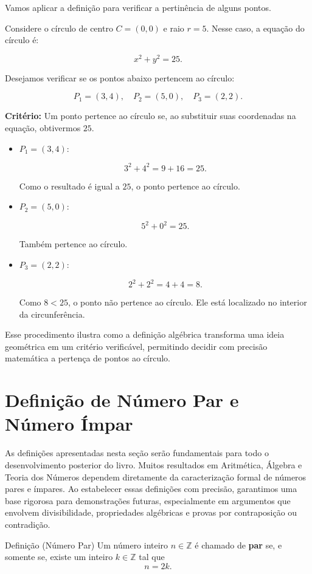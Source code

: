 \documentclass[12pt,a4paper,openright]{book}
\begin{document}
Vamos aplicar a definição para verificar a pertinência de alguns pontos.

Considere o círculo de centro \(C = (0,0)\) e raio \(r = 5\). Nesse caso, a equação do círculo é:

\[
x^2 + y^2 = 25.
\]

Desejamos verificar se os pontos abaixo pertencem ao círculo:

\[
P_1 = (3,4), \quad P_2 = (5,0), \quad P_3 = (2,2).
\]

\textbf{Critério:} Um ponto pertence ao círculo se, ao substituir suas coordenadas na equação, obtivermos \(25\).

\begin{itemize}
\item \(P_1 = (3,4)\):

\[
3^2 + 4^2 = 9 + 16 = 25.
\]

Como o resultado é igual a \(25\), o ponto pertence ao círculo.

\item \(P_2 = (5,0)\):

\[
5^2 + 0^2 = 25.
\]

Também pertence ao círculo.

\item \(P_3 = (2,2)\):

\[
2^2 + 2^2 = 4 + 4 = 8.
\]

Como \(8 < 25\), o ponto não pertence ao círculo. Ele está localizado no interior da circunferência.
\end{itemize}

Esse procedimento ilustra como a definição algébrica transforma uma ideia geométrica em um critério verificável, permitindo decidir com precisão matemática a pertença de pontos ao círculo.\section{Definição de Número Par e Número Ímpar}

As definições apresentadas nesta seção serão fundamentais para todo o desenvolvimento posterior do livro. Muitos resultados em Aritmética, Álgebra e Teoria dos Números dependem diretamente da caracterização formal de números pares e ímpares. Ao estabelecer essas definições com precisão, garantimos uma base rigorosa para demonstrações futuras, especialmente em argumentos que envolvem divisibilidade, propriedades algébricas e provas por contraposição ou contradição.

\begin{block}{Definição (Número Par)}
Um número inteiro \(n \in \mathbb{Z}\) é chamado de \textbf{par} se, e somente se, existe um inteiro \(k \in \mathbb{Z}\) tal que
\[
n = 2k.
\]
\end{block}
\end{document}
